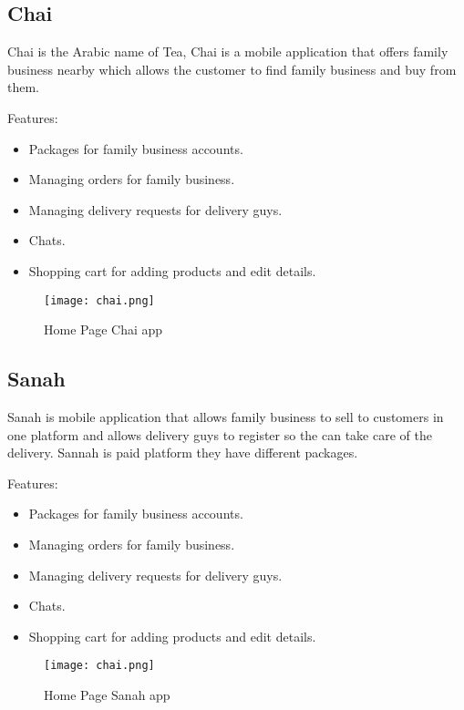 \documentclass[11pt]{article}
\newcommand\tab[1][1cm]{\hspace*{#1}}
\begin{document}
\subsection{Chai}

\tab Chai is the Arabic name of Tea, Chai is a mobile application that offers family business nearby which allows the customer to find family business and buy from them.


Features: 
\begin{itemize}
\item Packages for family business accounts.
\item Managing orders for family business.
\item Managing delivery requests for delivery guys.
\item Chats.
\item Shopping cart for adding products and edit details.
\end{itemize}

\begin{figure} [h]
\begin{center}
\texttt{[image: chai.png]}
\end{center}
\caption{Home Page Chai app}
  \label{fig:homecooking}
\end{figure}
\clearpage 
\newpage 

\subsection{Sanah}
\tab Sanah is mobile application that allows family business to sell to customers in one platform and allows delivery guys to register so the can take care of the delivery. Sannah is paid platform they have different packages.

 Features: 
 \begin{itemize}
\item Packages for family business accounts.
\item Managing orders for family business.
\item Managing delivery requests for delivery guys.
\item Chats.
\item Shopping cart for adding products and edit details.
\end{itemize}

 \begin{figure} [h]
\begin{center}
\texttt{[image: chai.png]}
\end{center}
\caption{Home Page Sanah app}
  \label{fig:sanah}
\end{figure}
\clearpage 
\newpage 
\end{document}

